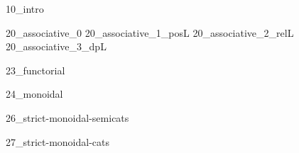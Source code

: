 
\label{chap:parallelism}
{10_intro}

{20_associative_0}
{20_associative_1_posL}
{20_associative_2_relL}
{20_associative_3_dpL}

{23_functorial}

{24_monoidal}

{26_strict-monoidal-semicats}

{27_strict-monoidal-cats}


